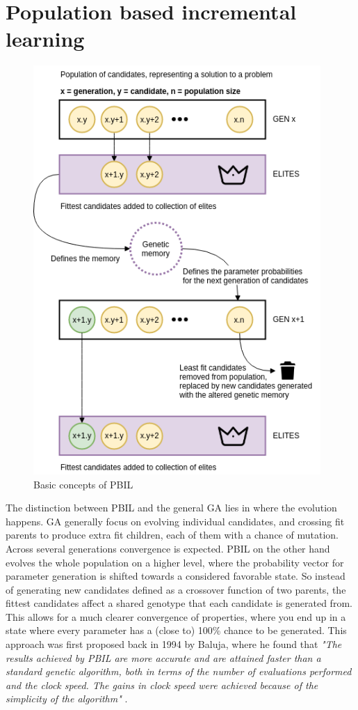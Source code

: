 \documentclass[a4paper,english]{report}
\begin{document}
	\pagebreak
	\section{Population based incremental learning}
	\begin{figure}[H]
		\centering
		\includegraphics[width=310pt]{PBIL}
		\caption{Basic concepts of PBIL}
	\end{figure}
	The distinction between PBIL and the general GA lies in where the evolution happens. GA generally focus on evolving individual candidates, and crossing fit parents to produce extra fit children, each of them with a chance of mutation. Across several generations convergence is expected. PBIL on the other hand evolves the whole population on a higher level, where the probability vector for parameter generation is shifted towards a considered favorable state. So instead of generating new candidates defined as a crossover function of two parents, the fittest candidates affect a shared genotype that each candidate is generated from. This allows for a much clearer convergence of properties, where you end up in a state where every parameter has a (close to) 100\% chance to be generated. This approach was first proposed back in 1994 by Baluja, where he found that \textit{"The results achieved by PBIL are more accurate and are attained faster than a standard genetic algorithm, both in terms of the number of evaluations performed and the clock speed. The gains in clock speed were achieved because of the simplicity of the algorithm"} \cite{pbil}.
\end{document}
